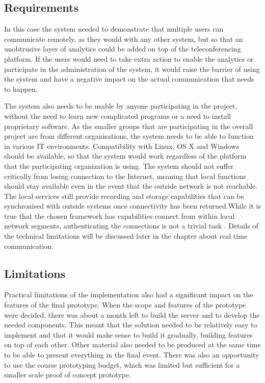 \documentclass[english,12pt,a4paper,pdftex]{article}
\begin{document}
\subsection{Requirements}

In this case the system needed to demonstrate that multiple users can communicate remotely, as they would with any other system, but so that an unobtrusive layer of analytics could be added on top of the teleconferencing platform. If the users would need to take extra action to enable the analytics or participate in the administration of the system, it would raise the barrier of using the system and have a negative impact on the actual communication that needs to happen. 

The system also needs to be usable by anyone participating in the project, without the need to learn new complicated programs or a need to install proprietary software. As the smaller groups that are participating in the overall project are from different organisations, the system needs to be able to function in various IT environments. Compatibility with Linux, OS X and Windows should be available, so that the system would work regardless of the platform that the participating organization is using. The system should not suffer critically from losing connection to the Internet, meaning that local functions should stay available even in the event that the outside network is not reachable. The local services still provide recording and storage capabilities that can be synchronised with outside systems once connectivity has been returned.While it is true that the chosen framework has capabilities connect from within local network segments, authenticating the connections is not a trivial task \cite{Johnston}. Details of the technical limitations will be discussed later in the chapter about real time communication.


\subsection{Limitations}

Practical limitations of the implementation also had a significant impact on the features of the final prototype. When the scope and features of the prototype were decided, there was about a month left to build the server and to develop the needed components. This meant that the solution needed to be relatively easy to implement and that it would make sense to build it gradually, building features on top of each other. Other material also needed to be produced at the same time to be able to present everything in the final event. There was also an opportunity to use the course prototyping budget, which was limited but sufficient for a smaller scale proof of concept prototype.
\end{document}
